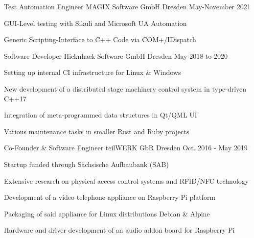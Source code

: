 
\begin{cventries}

  \cventry
    {Test Automation Engineer} %
    {MAGIX Software GmbH} %
    {Dresden} %
    {May-November 2021} %
    {
      \begin{cvitems} %
        \item {GUI-Level testing with Sikuli and Microsoft UA Automation}
        \item {Generic Scripting-Interface to C++ Code via COM+/IDispatch}
      \end{cvitems}
    }


  \cventry
    {Software Developer} %
    {Hicknhack Software GmbH} %
    {Dresden} %
    {May 2018 to 2020} %
    {
      \begin{cvitems} %
        \item {Setting up internal CI infrastructure for Linux \& Windows}
        \item {New development of a distributed stage machinery control system in type-driven C++17}
        \item {Integration of meta-programmed data structures in Qt/QML UI}
        \item {Various maintenance tasks in smaller Rust and Ruby projects}
      \end{cvitems}
    }



  \cventry
    {Co-Founder \& Software Engineer} %
    {teilWERK GbR} %
    {Dresden} %
    {Oct. 2016 - May 2019} %
    {
      \begin{cvitems} %
        \item {Startup funded through Sächsische Aufbaubank (SAB) }
        \item {Extensive research on physical access control systems and RFID/NFC technology}
        \item {Development of a video telephone appliance on Raspberry Pi platform}
        \item {Packaging of said appliance for Linux distributions Debian \& Alpine }
        \item {Hardware and driver development of an audio addon board for Raspberry Pi }
      \end{cvitems}
    }


\end{cventries}
